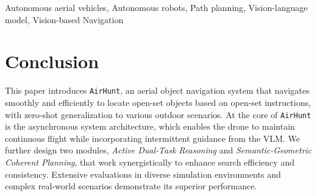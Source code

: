 \documentclass[lettersize,journal]{IEEEtran}
\def\sysname{\texttt{AirHunt}\xspace}
\begin{document}
\vspace{-20pt}
\def\abstractname{Note to Practitioners}
\begin{abstract}
This work addresses a critical challenge: drones struggle to efficiently locate arbitrary objects in large outdoor environments when following natural language instructions (e.g., ``a lost red backpack in the forest''). Existing solutions force drones to hover while waiting for AI (VLM) calculations, disrupting continuous flight and slowing search speed, while over-reliance on these AI models leads to short-sighted decisions, abandoning promising areas too early or revisiting already searched spots. \sysname solves these issues with two key practical improvements: (i) an asynchronous design that lets AI reasoning and flight planning run in parallel, enabling smooth, non-stop flight; (ii) smart logic to use AI only for important camera frames and plan routes that prioritize high-potential areas while avoiding redundant travel. For industry users, this translates to faster search times, higher success rates, and better use of drone battery life, which are critical for real-world missions. Limitations include single-drone operation and network connectivity requirements. Future work could extend it to a multi-robot setup and other autonomous systems.
\end{abstract}
\vspace{-6pt}
\begin{IEEEkeywords}
Autonomous aerial vehicles, Autonomous robots, Path planning, Vision-language model, Vision-based Navigation
\end{IEEEkeywords}







\section{Conclusion}
This paper introduces \sysname, an aerial object navigation system that navigates smoothly and efficiently to locate open-set objects based on open-set instructions, with zero-shot generalization to various outdoor scenarios.
At the core of \sysname is the asynchronous system architecture, which enables the drone to maintain continuous flight while incorporating intermittent guidance from the VLM. 
We further design two modules, \textit{Active Dual-Task Reasoning} and \textit{Semantic-Geometric Coherent Planning}, that work synergistically to enhance search efficiency and consistency.
Extensive evaluations in diverse simulation environments and complex real-world scenarios demonstrate its superior performance.
\end{document}
